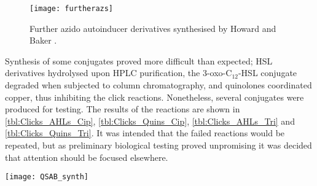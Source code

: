 \begin{figure}[H]
	\begin{center}
		\texttt{[image: furtherazs]}
		\caption{Further azido autoinducer derivatives synthesised by Howard\cite{Howard2015}  and Baker\cite{Baker2015} .\label{fgr:furtherazs}} 
	\end{center}
\end{figure}

Synthesis of some conjugates proved more difficult than expected; HSL derivatives hydrolysed upon HPLC purification, the 3-oxo-C$_{12}$-HSL conjugate degraded when subjected to column chromatography, and quinolones coordinated copper, thus inhibiting the click reactions. Nonetheless, several conjugates were produced for testing. The results of the reactions are shown in \ref{tbl:Clicks_AHLs_Cip}, \ref{tbl:Clicks_Quins_Cip}, \ref{tbl:Clicks_AHLs_Tri} and \ref{tbl:Clicks_Quins_Tri}. It was intended that the failed reactions would be repeated, but as preliminary biological testing  proved unpromising it was decided that attention should be focused elsewhere.

\begin{scheme}[H]
	\begin{center}
		\texttt{[image: QSAB\_synth]}
		\caption{General scheme for the click reaction, where R$_1$-N$_3$ is an azido autoinducer derivative and R$_2$-$\equiv$ is an alkynyl antibiotic derivative a), sodium ascorbate, TBTA, , \textit{t}-BuOH.\label{sch:QSAB_synth}} 
	\end{center}
\end{scheme}


